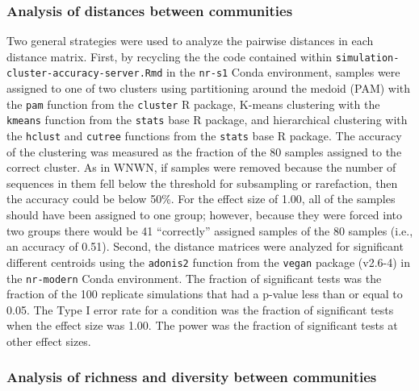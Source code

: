 \documentclass[
]{article}
\begin{document}
\hypertarget{analysis-of-distances-between-communities}{%
\subsubsection{Analysis of distances between
communities}\label{analysis-of-distances-between-communities}}

Two general strategies were used to analyze the pairwise distances in
each distance matrix. First, by recycling the the code contained within
\texttt{simulation-cluster-accuracy-server.Rmd} in the \texttt{nr-s1}
Conda environment, samples were assigned to one of two clusters using
partitioning around the medoid (PAM) with the \texttt{pam} function from
the \texttt{cluster} R package, K-means clustering with the
\texttt{kmeans} function from the \texttt{stats} base R package, and
hierarchical clustering with the \texttt{hclust} and \texttt{cutree}
functions from the \texttt{stats} base R package. The accuracy of the
clustering was measured as the fraction of the 80 samples assigned to
the correct cluster. As in WNWN, if samples were removed because the
number of sequences in them fell below the threshold for subsampling or
rarefaction, then the accuracy could be below 50\%. For the effect size
of 1.00, all of the samples should have been assigned to one group;
however, because they were forced into two groups there would be 41
``correctly'' assigned samples of the 80 samples (i.e., an accuracy of
0.51). Second, the distance matrices were analyzed for significant
different centroids using the \texttt{adonis2} function from the
\texttt{vegan} package (v2.6-4) in the \texttt{nr-modern} Conda
environment. The fraction of significant tests was the fraction of the
100 replicate simulations that had a p-value less than or equal to 0.05.
The Type I error rate for a condition was the fraction of significant
tests when the effect size was 1.00. The power was the fraction of
significant tests at other effect sizes.

\hypertarget{analysis-of-richness-and-diversity-between-communities}{%
\subsubsection{Analysis of richness and diversity between
communities}\label{analysis-of-richness-and-diversity-between-communities}}
\end{document}

